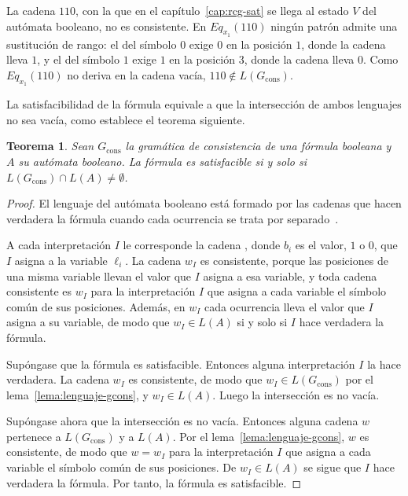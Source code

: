 \documentclass{report}
\theoremstyle{definition}
\theoremstyle{plain}
\newtheorem{teorema}{Teorema}[chapter]
\theoremstyle{remark}
\begin{document}
La cadena $110$, con la que en el capítulo~\ref{cap:rcg-sat} se llega
al estado $V$ del autómata booleano, no es consistente. En
$Eq_{x_1}(110)$ ningún patrón admite una sustitución de rango: el del
símbolo $0$ exige $0$ en la posición $1$, donde la cadena lleva $1$, y
el del símbolo $1$ exige $1$ en la posición $3$, donde la cadena lleva
$0$.
Como $Eq_{x_1}(110)$ no deriva en la cadena vacía,
$110 \notin L(G_{\mathrm{cons}})$.

La satisfacibilidad de la fórmula equivale a que la intersección de
ambos lenguajes no sea vacía, como establece el teorema siguiente.

\begin{teorema}
  \label{teo:sat-vacio-interseccion}
  Sean $G_{\mathrm{cons}}$ la gramática de consistencia de una fórmula
  booleana y $A$ su autómata booleano. La fórmula es satisfacible si y
  solo si $L(G_{\mathrm{cons}}) \cap L(A) \neq \emptyset$.
\end{teorema}

\begin{proof}
  El lenguaje del autómata booleano está formado por las cadenas que
  hacen verdadera la fórmula cuando cada ocurrencia se trata por
  separado~\cite{fernandezarias2007}.

  A cada interpretación $I$ le corresponde la cadena
  , donde $b_i$ es el valor, $1$ o $0$, que
  $I$ asigna a la variable $\ell_i$. La cadena $w_I$ es consistente,
  porque las posiciones de una misma variable llevan el valor que $I$
  asigna a esa variable, y toda cadena consistente es $w_I$ para la
  interpretación $I$ que asigna a cada variable el símbolo común de sus
  posiciones. Además, en $w_I$ cada ocurrencia lleva el valor que $I$
  asigna a su variable, de modo que $w_I \in L(A)$ si y solo si $I$
  hace verdadera la fórmula.

  Supóngase que la fórmula es satisfacible. Entonces alguna
  interpretación $I$ la hace verdadera. La cadena $w_I$ es consistente,
  de modo que $w_I \in L(G_{\mathrm{cons}})$ por el
  lema~\ref{lema:lenguaje-gcons}, y $w_I \in L(A)$. Luego la
  intersección es no vacía.

  Supóngase ahora que la intersección es no vacía. Entonces alguna
  cadena $w$ pertenece a $L(G_{\mathrm{cons}})$ y a $L(A)$. Por el
  lema~\ref{lema:lenguaje-gcons}, $w$ es consistente, de modo que
  $w = w_I$ para la interpretación $I$ que asigna a cada variable el
  símbolo común de sus posiciones. De $w_I \in L(A)$ se sigue que $I$
  hace verdadera la fórmula. Por tanto, la fórmula es satisfacible.
\end{proof}
\end{document}

